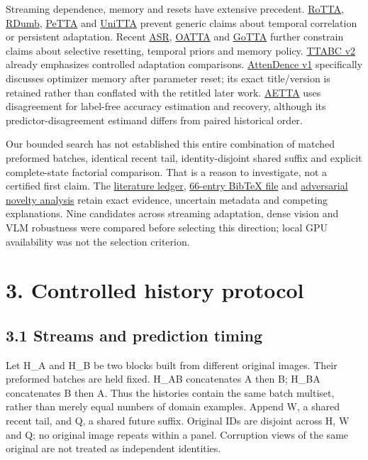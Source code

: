 \documentclass[11pt]{article}
\begin{document}
Streaming dependence, memory and resets have extensive precedent. \href{https://arxiv.org/abs/2303.13899}{RoTTA}, \href{https://nips.cc/virtual/2023/poster/71448}{RDumb}, \href{https://arxiv.org/abs/2311.18193}{PeTTA} and \href{https://arxiv.org/abs/2407.20080}{UniTTA} prevent generic claims about temporal correlation or persistent adaptation. Recent \href{https://arxiv.org/abs/2603.03796}{ASR}, \href{https://arxiv.org/abs/2601.21012}{OATTA} and \href{https://arxiv.org/abs/2605.19890}{GoTTA} further constrain claims about selective resetting, temporal priors and memory policy. \href{https://arxiv.org/abs/2606.14299v2}{TTABC v2} already emphasizes controlled adaptation comparisons. \href{https://arxiv.org/abs/2511.18925v1}{AttenDence v1} specifically discusses optimizer memory after parameter reset; its exact title/version is retained rather than conflated with the retitled later work. \href{https://openaccess.thecvf.com/content/CVPR2024/html/Lee\_AETTA\_Label-Free\_Accuracy\_Estimation\_for\_Test-Time\_Adaptation\_CVPR\_2024\_paper.html}{AETTA} uses disagreement for label-free accuracy estimation and recovery, although its predictor-disagreement estimand differs from paired historical order.

Our bounded search has not established this entire combination of matched preformed batches, identical recent tail, identity-disjoint shared suffix and explicit complete-state factorial comparison. That is a reason to investigate, not a certified first claim. The \href{../research/literature\_review.md}{literature ledger}, \href{../research/references.bib}{66-entry BibTeX file} and \href{../research/novelty\_analysis.md}{adversarial novelty analysis} retain exact evidence, uncertain metadata and competing explanations. Nine candidates across streaming adaptation, dense vision and VLM robustness were compared before selecting this direction; local GPU availability was not the selection criterion.

\section*{3. Controlled history protocol}

\subsection*{3.1 Streams and prediction timing}

Let H\_A and H\_B be two blocks built from different original images. Their preformed batches are held fixed. H\_AB concatenates A then B; H\_BA concatenates B then A. Thus the histories contain the same batch multiset, rather than merely equal numbers of domain examples. Append W, a shared recent tail, and Q, a shared future suffix. Original IDs are disjoint across H, W and Q; no original image repeats within a panel. Corruption views of the same original are not treated as independent identities.
\end{document}

